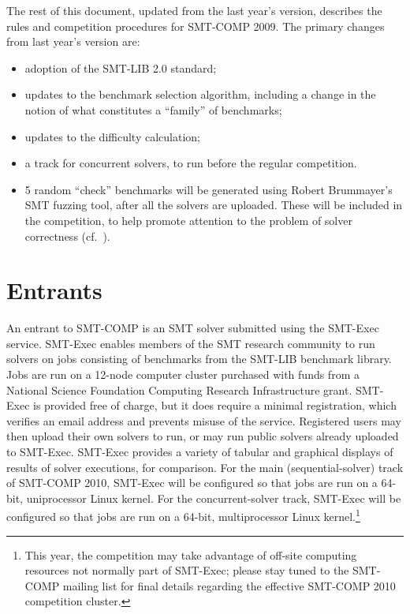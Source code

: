 \documentclass[12pt]{article}
\begin{document}
The rest of this document, updated from the last year's version,
describes the rules and competition procedures for SMT-COMP 2009.
The primary changes from last year's version are:

\begin{itemize}
\item adoption of the SMT-LIB 2.0 standard;
\item updates to the benchmark selection algorithm, including a change
  in the notion of what constitutes a ``family'' of benchmarks;
\item updates to the difficulty calculation;
\item a track for concurrent solvers, to run before the
  regular competition.
\item 5 random ``check'' benchmarks will be generated using Robert
  Brummayer's SMT fuzzing tool, after all the solvers are uploaded.
  These will be included in the competition, to help promote attention
  to the problem of solver correctness (cf.~\cite{brummayer+09}).
\end{itemize}

\section{Entrants}
\label{sec:entrants}

An entrant to SMT-COMP is an SMT solver
submitted using the SMT-Exec service.  SMT-Exec enables members of the
SMT research community to run solvers on jobs consisting of benchmarks
from the SMT-LIB benchmark library.  Jobs are run on a 12-node computer
cluster purchased with funds from a National Science Foundation
Computing Research Infrastructure grant.  SMT-Exec is provided free of
charge, but it does require a minimal registration, which verifies an
email address and prevents misuse of the service.  Registered users
may then upload their own solvers to run, or may run public solvers
already uploaded to SMT-Exec.  SMT-Exec provides a variety of tabular
and graphical displays of results of solver executions, for
comparison. For the main (sequential-solver) track of SMT-COMP 2010,
SMT-Exec will be configured so that jobs are run on a 64-bit,
uniprocessor Linux kernel.  For the concurrent-solver track, SMT-Exec
will be configured so that jobs are run on a 64-bit, multiprocessor
Linux kernel.\footnote{This year, the competition may take
  advantage of off-site computing resources not normally part of
  SMT-Exec; please stay tuned to the SMT-COMP mailing list for final
  details regarding the effective SMT-COMP 2010 competition cluster.}
\end{document}
